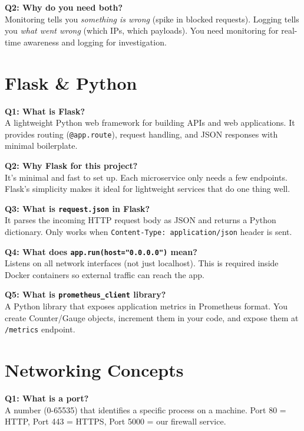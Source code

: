 \documentclass[12pt,a4paper]{article}
\begin{document}
\textbf{Q2: Why do you need both?}\\
Monitoring tells you \textit{something is wrong} (spike in blocked requests). Logging tells you \textit{what went wrong} (which IPs, which payloads). You need monitoring for real-time awareness and logging for investigation.

\section{Flask \& Python}

\textbf{Q1: What is Flask?}\\
A lightweight Python web framework for building APIs and web applications. It provides routing (\texttt{@app.route}), request handling, and JSON responses with minimal boilerplate.

\textbf{Q2: Why Flask for this project?}\\
It's minimal and fast to set up. Each microservice only needs a few endpoints. Flask's simplicity makes it ideal for lightweight services that do one thing well.

\textbf{Q3: What is \texttt{request.json} in Flask?}\\
It parses the incoming HTTP request body as JSON and returns a Python dictionary. Only works when \texttt{Content-Type: application/json} header is sent.

\textbf{Q4: What does \texttt{app.run(host="0.0.0.0")} mean?}\\
Listens on all network interfaces (not just localhost). This is required inside Docker containers so external traffic can reach the app.

\textbf{Q5: What is \texttt{prometheus\_client} library?}\\
A Python library that exposes application metrics in Prometheus format. You create Counter/Gauge objects, increment them in your code, and expose them at \texttt{/metrics} endpoint.

\section{Networking Concepts}

\textbf{Q1: What is a port?}\\
A number (0-65535) that identifies a specific process on a machine. Port 80 = HTTP, Port 443 = HTTPS, Port 5000 = our firewall service.
\end{document}
